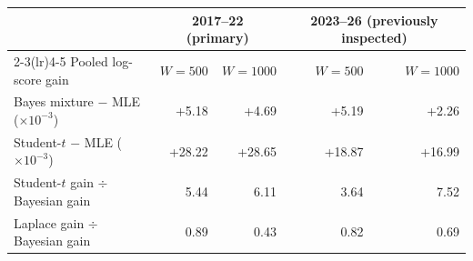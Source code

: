 \begin{tabular}{lrrrr}\toprule
 & \multicolumn{2}{c}{2017--22 (primary)} & \multicolumn{2}{c}{2023--26 (previously inspected)}\\\cmidrule(lr){2-3}\cmidrule(lr){4-5}
Pooled log-score gain & $W{=}500$ & $W{=}1000$ & $W{=}500$ & $W{=}1000$\\\midrule
Bayes mixture $-$ MLE ($\times10^{-3}$) & +5.18 & +4.69 & +5.19 & +2.26 \\
Student-$t$ $-$ MLE ($\times10^{-3}$) & +28.22 & +28.65 & +18.87 & +16.99 \\
Student-$t$ gain $\div$ Bayesian gain & 5.44 & 6.11 & 3.64 & 7.52 \\
Laplace gain $\div$ Bayesian gain & 0.89 & 0.43 & 0.82 & 0.69 \\
\bottomrule\end{tabular}
